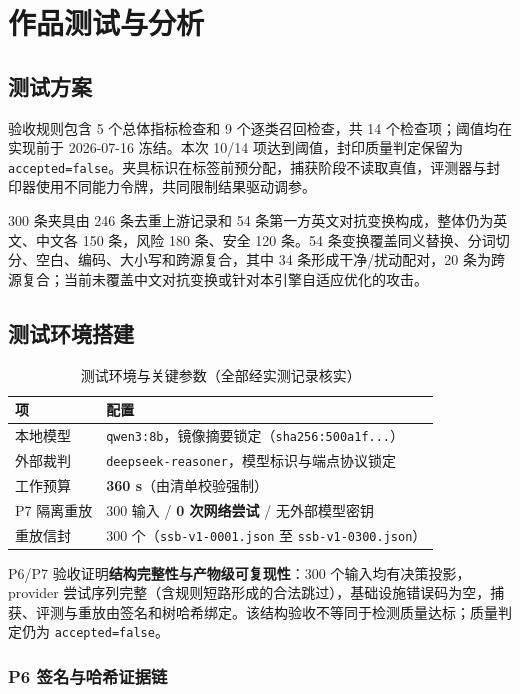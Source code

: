 \section{作品测试与分析}

\subsection{测试方案}

验收规则包含 5 个总体指标检查和 9 个逐类召回检查，共 14 个检查项；阈值均在实现前于 2026-07-16 冻结。本次 10/14 项达到阈值，封印质量判定保留为 \verb|accepted=false|。夹具标识在标签前预分配，捕获阶段不读取真值，评测器与封印器使用不同能力令牌，共同限制结果驱动调参。

300 条夹具由 246 条去重上游记录和 54 条第一方英文对抗变换构成，整体仍为英文、中文各 150 条，风险 180 条、安全 120 条。54 条变换覆盖同义替换、分词切分、空白、编码、大小写和跨源复合，其中 34 条形成干净/扰动配对，20 条为跨源复合；当前未覆盖中文对抗变换或针对本引擎自适应优化的攻击。

\subsection{测试环境搭建}

\begin{table}[htbp]
\centering
\caption{测试环境与关键参数（全部经实测记录核实）}
\label{tab:env}
\small
\begin{tabular}{@{}lp{7.4cm}@{}}
\toprule
项 & 配置 \\
\midrule
本地模型 & \verb|qwen3:8b|，镜像摘要锁定（\verb|sha256:500a1f...|）\\
外部裁判 & \verb|deepseek-reasoner|，模型标识与端点协议锁定 \\
工作预算 & \textbf{360 s}（由清单校验强制）\\
P7 隔离重放 & 300 输入 / \textbf{0 次网络尝试} / 无外部模型密钥 \\
重放信封 & 300 个（\verb|ssb-v1-0001.json| 至 \verb|ssb-v1-0300.json|）\\
\bottomrule
\end{tabular}
\end{table}

P6/P7 验收证明\textbf{结构完整性与产物级可复现性}：300 个输入均有决策投影，provider 尝试序列完整（含规则短路形成的合法跳过），基础设施错误码为空，捕获、评测与重放由签名和树哈希绑定。该结构验收不等同于检测质量达标；质量判定仍为 \verb|accepted=false|。

\subsubsection{P6 签名与哈希证据链}

